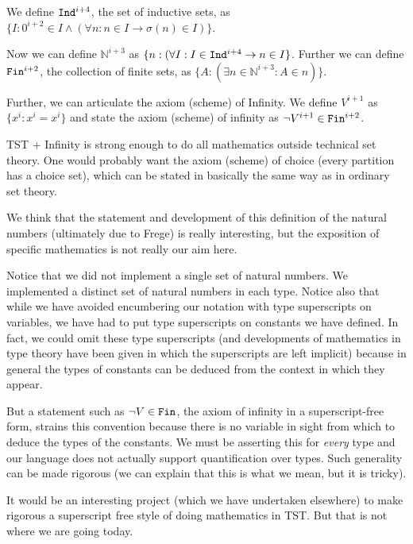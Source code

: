 \documentclass{slides}
\begin{document}
\begin{slide}

We define ${\tt Ind}^{i+4}$, the set of inductive sets, as $\{I:0^{i+2} \in I \wedge (\forall n:n \in I \rightarrow \sigma(n) \in I)\}$.

Now we can define ${\mathbb N}^{i+3}$ as \newline $\{n:(\forall I:I \in {\tt Ind}^{i+4} \rightarrow n \in I\}$.  Further we can define ${\tt Fin}^{i+2}$, the collection of finite sets, as $\{A:(\exists n \in {\mathbb N}^{i+3}:A \in n)\}$.

Further, we can articulate the axiom (scheme) of Infinity.  We define $V^{i+1}$ as $\{x^i:x^i=x^i\}$ and state the axiom (scheme) of infinity as $\neg V^{i+1} \in {\tt Fin}^{i+2}$.

TST + Infinity is strong enough to do all mathematics outside technical set theory.  One would probably want the axiom (scheme) of choice (every partition has a choice set), which can be stated in basically the same way as in ordinary set theory.

\end{slide}

\begin{slide}

We think that the statement and development of this definition of the natural numbers (ultimately due to Frege) is really interesting, but the exposition of specific mathematics is not really our aim here.

Notice that we did not implement a single set of natural numbers.   We implemented a distinct set of natural numbers in each type.  Notice also that while we have avoided encumbering our notation with type superscripts on variables, we have had to put type superscripts on constants we have defined.  In fact, we could omit these type superscripts (and developments of mathematics in type theory have been given in which the superscripts are left implicit) because in general the types of constants can be deduced from the context in which they appear.   
\end{slide}

\begin{slide}

But a statement such as $\neg V \in {\tt Fin}$, the axiom of infinity in a superscript-free form, strains this convention because there is no variable in sight from which to deduce the types of the constants.  We must be asserting this for {\em every\/} type and our language does not actually support quantification over types.   Such generality can be made rigorous (we can explain that this is what we mean, but it is tricky).

It would be an interesting project (which we have undertaken elsewhere) to make rigorous a superscript free style of doing mathematics in TST.  But that is not where we are going today.

\end{slide}
\end{document}
